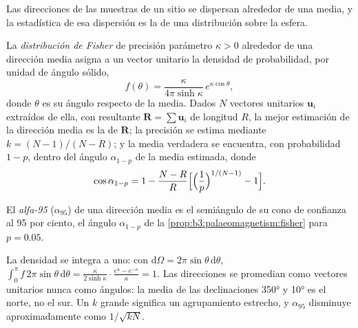 \begin{omfigure}
\par{}\label{fig:b3:palaeomagnetism:zijderveld}
\end{omfigure}

Las direcciones de las muestras de un sitio se dispersan alrededor de una media, y la
estadística de esa dispersión es la de una distribución sobre la esfera.

\begin{proposition}\label{prop:b3:palaeomagnetism:fisher}
La \emph{distribución de Fisher} de precisión
parámetro $\kappa > 0$ alrededor de una dirección media asigna a un vector unitario la
densidad de probabilidad, por unidad de ángulo sólido,
\[
  f(\theta) = \frac{\kappa}{4\pi\sinh\kappa}\,e^{\kappa\cos\theta},
\]
donde $\theta$ es su ángulo respecto de la media. Dados $N$ vectores unitarios $\mathbf u_i$
extraídos de ella, con resultante $\mathbf R = \sum\mathbf u_i$ de longitud $R$, la
mejor estimación de la dirección media es la de $\mathbf R$; la precisión se
estima mediante $k = (N - 1)/(N - R)$; y la media verdadera se encuentra, con probabilidad
$1 - p$, dentro del ángulo $\alpha_{1-p}$ de la media estimada, donde
\[
  \cos\alpha_{1-p} = 1 - \frac{N - R}{R}\Bigl[\Bigl(\frac1p\Bigr)^{1/(N-1)} - 1\Bigr].
\]
\end{proposition}
\admitted

\begin{definition}[Alfa-95]\label{def:b3:palaeomagnetism:a95}
El \emph{alfa-95} ($\alpha_{95}$) de una dirección media es el
semiángulo de su cono de confianza al 95 por ciento, el ángulo $\alpha_{1-p}$ de
la \cref{prop:b3:palaeomagnetism:fisher} para $p = 0.05$.
\end{definition}

La densidad se integra a uno: con $\mathrm d\Omega = 2\pi\sin\theta\,\mathrm
d\theta$, $\int_0^\pi f\,2\pi\sin\theta\,\mathrm d\theta =
\frac{\kappa}{2\sinh\kappa}\cdot\frac{e^\kappa - e^{-\kappa}}{\kappa} = 1$. Las direcciones se promedian como vectores unitarios
nunca como ángulos: la media de las declinaciones \ang{350} y \ang{10} es
el norte, no el sur. Un $k$ grande significa un agrupamiento estrecho, y $\alpha_{95}$ disminuye
aproximadamente como $1/\sqrt{kN}$.

